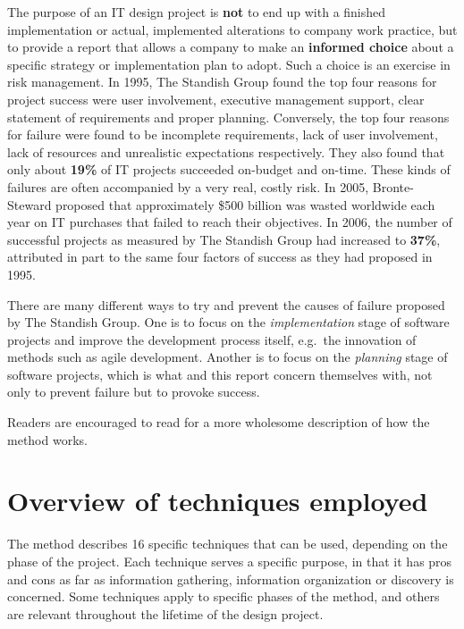 The purpose of an IT design project is \textbf{not} to end up with a
finished implementation or actual, implemented alterations to company work
practice, but to provide a report that allows a company to make an
\textbf{informed choice} about a specific strategy or implementation plan to
adopt. Such a choice is an exercise in risk management. In 1995, The Standish
Group found the top four reasons for project success were user involvement,
executive management support, clear statement of requirements and proper
planning\cite{standish1995chaos}. Conversely, the top four reasons for failure
were found to be incomplete requirements, lack of user involvement, lack of
resources and unrealistic expectations respectively\cite{standish1995chaos}.
They also found that only about \textbf{19\%} of IT projects succeeded on-budget
and on-time. These kinds of failures are often accompanied by a very real, costly risk. 
In 2005, Bronte-Steward proposed that approximately \$500 billion was wasted
worldwide each year on IT purchases that failed to reach their
objectives\cite{bronte2005developing}. In 2006, the number of successful
projects as measured by The Standish Group\cite{standish2012} had increased to
\textbf{37\%}, attributed in part to the same four factors of success as they had
proposed in 1995. 

There are many different ways to try and prevent the causes of failure 
proposed by The Standish Group. One is to focus on the \textit{implementation} stage of
software projects and improve the development process itself, e.g.\ the
innovation of methods such as agile development. Another is to focus on the
\textit{planning} stage of software projects, which is what \must{} and this
report concern themselves with, not only to prevent failure but to provoke
success.

Readers are encouraged to read \cite{bodker2004participatory} for a more
wholesome description of how the \must{} method works.

\section{Overview of techniques employed} \label{sec:overview}
The \must{} method describes 16 specific techniques that can be used, depending
on the phase of the project. Each technique serves a specific purpose, in that it
has pros and cons as far as information gathering, information organization or discovery
is concerned. Some techniques apply to specific phases of the \must{} method, and others
are relevant throughout the lifetime of the design project.

